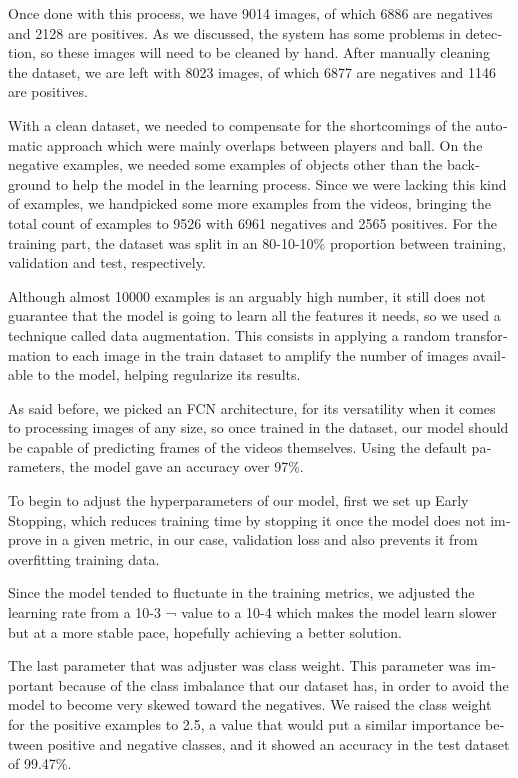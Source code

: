 \begin{otherlanguage}{english}
Once done with this process, we have 9014 images, of which 6886 are negatives and 2128 are positives. As we discussed, the system has some problems in detection, so these images will need to be cleaned by hand. After manually cleaning the dataset, we are left with 8023 images, of which 6877 are negatives and 1146 are positives.

With a clean dataset, we needed to compensate for the shortcomings of the automatic approach which were mainly overlaps between players and ball. On the negative examples, we needed some examples of objects other than the background to help the model in the learning process. Since we were lacking this kind of examples, we handpicked some more examples from the videos, bringing the total count of examples to 9526 with 6961 negatives and 2565 positives. For the training part, the dataset was split in an 80-10-10\% proportion between training, validation and test, respectively. 

Although almost 10000 examples is an arguably high number, it still does not guarantee that the model is going to learn all the features it needs, so we used a technique called data augmentation. This consists in applying a random transformation to each image in the train dataset to amplify the number of images available to the model, helping regularize its results.

As said before, we picked an FCN architecture, for its versatility when it comes to processing images of any size, so once trained in the dataset, our model should be capable of predicting frames of the videos themselves. Using the default parameters, the model gave an accuracy over 97\%.

To begin to adjust the hyperparameters of our model, first we set up Early Stopping, which reduces training time by stopping it once the model does not improve in a given metric, in our case, validation loss and also prevents it from overfitting training data.

Since the model tended to fluctuate in the training metrics, we adjusted the learning rate from a 10-3 ¬ value to a 10-4 which makes the model learn slower but at a more stable pace, hopefully achieving a better solution.

The last parameter that was adjuster was class weight. This parameter was important because of the class imbalance that our dataset has, in order to avoid the model to become very skewed toward the negatives. We raised the class weight for the positive examples to 2.5, a value that would put a similar importance between positive and negative classes, and it showed an accuracy in the test dataset of 99.47\%.


\end{otherlanguage}

